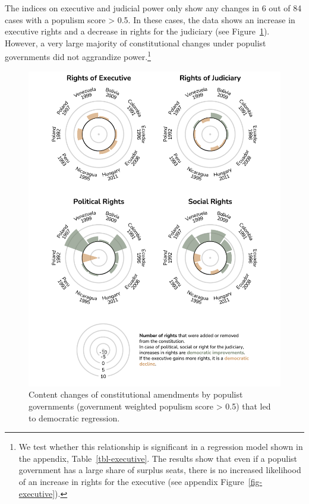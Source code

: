 \documentclass[
  abstract]{article}
\begin{document}
The indices on executive and judicial power only show any changes in 6
out of 84 cases with a populism score \textgreater{} 0.5. In these
cases, the data shows an increase in executive rights and a decrease in
rights for the judiciary (see Figure~\ref{fig-rightschange}). However, a
very large majority of constitutional changes under populist governments
did not aggrandize power.\footnote{We test whether this relationship is
  significant in a regression model shown in the appendix,
  Table~\ref{tbl-executive}. The results show that even if a populist
  government has a large share of surplus seats, there is no increased
  likelihood of an increase in rights for the executive (see appendix
  Figure~\ref{fig-executive}).}

\begin{figure}

{\centering \includegraphics[width=1\textwidth,height=\textheight]{results/graphs/rights_change.pdf}

}

\caption{\label{fig-rightschange}Content changes of constitutional
amendments by populist governments (government weighted populism score
\textgreater{} 0.5) that led to democratic regression.}

\end{figure}
\end{document}
